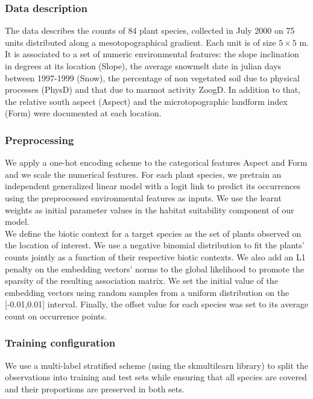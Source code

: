 \documentclass[]{article}
\begin{document}
\subsubsection{Data description}
The data describes the counts of 84 plant species, collected in July 2000 on 75 units distributed along a mesotopographical gradient. Each unit is of size $5 \times 5 $ m. It is associated to a set of numeric environmental features: the slope inclination in degrees at its location (Slope), the average snowmelt date in julian days between 1997-1999 (Snow), the percentage of non vegetated soil due to physical processes (PhysD) and that due to marmot activity ZoogD. In addition to that, the relative south aspect (Aspect) and the microtopographic landform index (Form) were documented at each location.

\subsubsection{Preprocessing}
We apply a one-hot encoding scheme to the categorical features Aspect and Form and we scale the numerical features. For each plant species, we pretrain an independent generalized linear model with a logit link to predict its occurrences using the preprocessed environmental features as inputs. We use the learnt weights as initial parameter values in the habitat suitability component of our model. \\

\noindent We define the biotic context for a target species as the set of plants observed on the location of interest. We use a negative binomial distribution to fit the plants’ counts jointly as a function of their respective biotic contexts.  We also add an L1 penalty on the embedding vectors’ norms to the global likelihood to promote the sparsity of the resulting association matrix. We set the initial value of the embedding vectors using random samples from a uniform distribution on the [-0.01,0.01] interval. Finally, the offset value for each species was set to its average count on occurrence points.

\subsubsection{Training configuration}
We use a multi-label stratified scheme (using the skmultilearn library) to split the observations into training and test sets while ensuring that all species are covered and their proportions are preserved in both sets. \\
\end{document}
